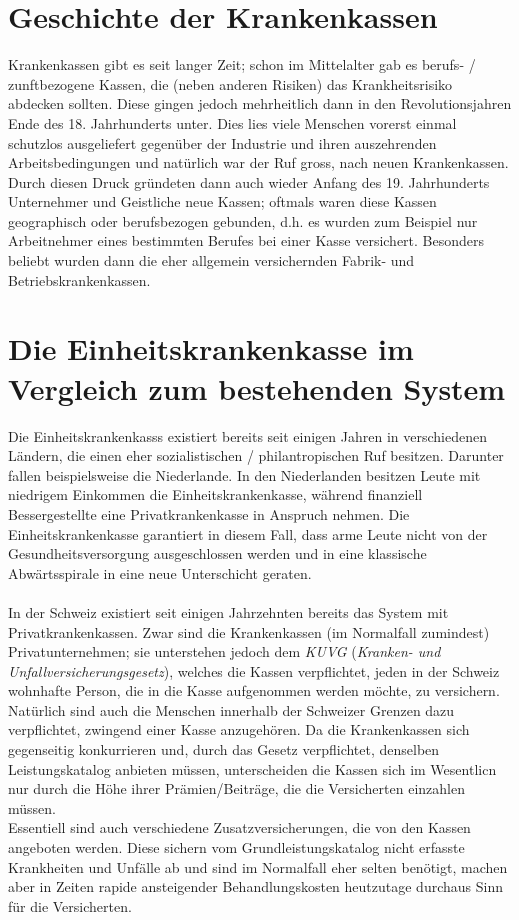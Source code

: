\documentclass[a4paper,12pt]{book}
\begin{document}
\section{Geschichte der Krankenkassen}
Krankenkassen gibt es seit langer Zeit; schon im Mittelalter gab es berufs- / zunftbezogene Kassen, die (neben anderen Risiken) das Krankheitsrisiko abdecken sollten. Diese gingen jedoch mehrheitlich dann in den Revolutionsjahren Ende des 18. Jahrhunderts unter.
Dies lies viele Menschen vorerst einmal schutzlos ausgeliefert gegenüber der Industrie und ihren auszehrenden Arbeitsbedingungen und natürlich war der Ruf gross, nach neuen Krankenkassen. Durch diesen Druck gründeten dann auch wieder Anfang des 19. Jahrhunderts Unternehmer und Geistliche neue Kassen; oftmals waren diese Kassen geographisch oder berufsbezogen gebunden, d.h. es wurden zum Beispiel nur Arbeitnehmer eines bestimmten Berufes bei einer Kasse versichert. Besonders beliebt wurden dann die eher allgemein versichernden Fabrik- und Betriebskrankenkassen.
\section{Die Einheitskrankenkasse im Vergleich zum bestehenden System}
Die Einheitskrankenkasss existiert bereits seit einigen Jahren in verschiedenen Ländern, die einen eher sozialistischen / philantropischen Ruf besitzen. Darunter fallen beispielsweise die Niederlande.
In den Niederlanden besitzen Leute mit niedrigem Einkommen die Einheitskrankenkasse, während finanziell Bessergestellte eine Privatkrankenkasse in Anspruch nehmen. Die Einheitskrankenkasse garantiert in diesem Fall, dass arme Leute nicht von der Gesundheitsversorgung ausgeschlossen werden und in eine klassische Abwärtsspirale in eine neue Unterschicht geraten.\\\\
In der Schweiz existiert seit einigen Jahrzehnten bereits das System mit Privatkrankenkassen. Zwar sind die Krankenkassen (im Normalfall zumindest) Privatunternehmen; sie unterstehen jedoch dem \emph{KUVG} (\textit{Kranken- und Unfallversicherungsgesetz}), welches die Kassen verpflichtet, jeden in der Schweiz wohnhafte Person, die in die Kasse aufgenommen werden möchte, zu versichern. Natürlich sind auch die Menschen innerhalb der Schweizer Grenzen dazu verpflichtet, zwingend einer Kasse anzugehören.
Da die Krankenkassen sich gegenseitig konkurrieren und, durch das Gesetz verpflichtet, denselben Leistungskatalog anbieten müssen, unterscheiden die Kassen sich im Wesentlicn nur durch die Höhe ihrer Prämien/Beiträge, die die Versicherten einzahlen müssen.\\
Essentiell sind auch verschiedene Zusatzversicherungen, die von den Kassen angeboten werden. Diese sichern vom Grundleistungskatalog nicht erfasste Krankheiten und Unfälle ab und sind im  Normalfall eher selten benötigt, machen aber in Zeiten rapide ansteigender Behandlungskosten heutzutage durchaus Sinn für die Versicherten.\\
\end{document}
